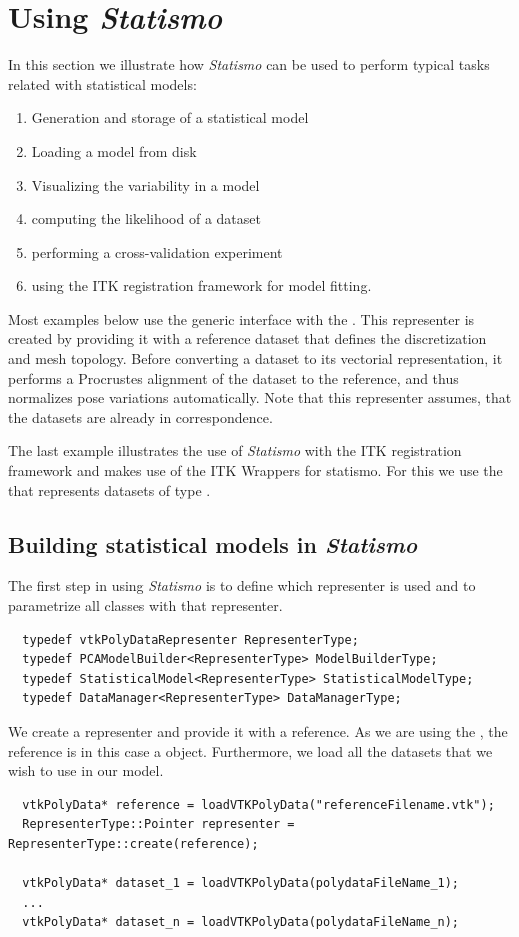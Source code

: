 \documentclass{InsightArticle}
\newcommand{\Statismo}{\emph{Statismo}\xspace}
\begin{document}
\section{Using \Statismo}
In this section we illustrate how \Statismo can be used to perform typical tasks related with statistical models:
\begin{enumerate}
  \item Generation and storage of a statistical model
  \item Loading a model from disk
  \item Visualizing the variability in  a model
  \item computing the likelihood of a dataset
  \item performing a cross-validation experiment
  \item using the ITK registration framework for model fitting. 
\end{enumerate}
Most examples below use  the generic
interface with the . This representer is
created by providing it with a reference dataset that defines the
discretization and mesh topology. Before converting a dataset to its
vectorial representation, it performs a Procrustes alignment
\cite{TODO} of the dataset to the reference, and thus normalizes pose
variations automatically. Note that this representer assumes, that the
datasets are already in correspondence.

The last example illustrates the use of \Statismo with the ITK
registration framework and makes use of the ITK Wrappers for
statismo. For this we use the  that represents datasets
of type . 


\subsection{Building statistical models in \Statismo}

The first step in using \Statismo is to define which representer is used and to parametrize all classes with that 
representer. 
\begin{verbatim}
  typedef vtkPolyDataRepresenter RepresenterType;
  typedef PCAModelBuilder<RepresenterType> ModelBuilderType;
  typedef StatisticalModel<RepresenterType> StatisticalModelType;
  typedef DataManager<RepresenterType> DataManagerType;
\end{verbatim}

We create a representer and provide it with a reference. As we are
using the , the reference is in this case
a  object.
Furthermore, we load all the datasets that we wish to use in our model.
\begin{verbatim}
  vtkPolyData* reference = loadVTKPolyData("referenceFilename.vtk");
  RepresenterType::Pointer representer = RepresenterType::create(reference);

  vtkPolyData* dataset_1 = loadVTKPolyData(polydataFileName_1);
  ... 
  vtkPolyData* dataset_n = loadVTKPolyData(polydataFileName_n);
\end{verbatim}
\end{document}
